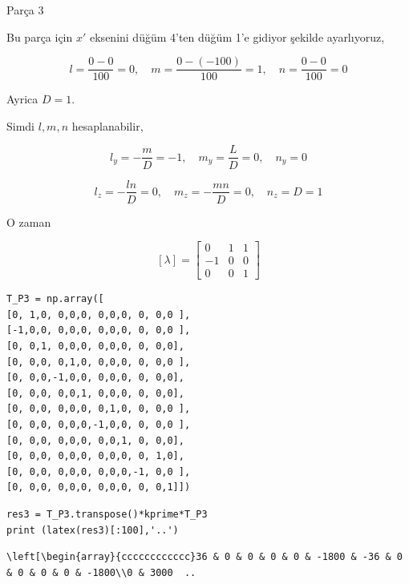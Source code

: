 \documentclass[12pt,fleqn]{article}\usepackage{../../common}
\begin{document}
Parça 3

Bu parça için $x'$ eksenini düğüm 4'ten düğüm 1'e gidiyor şekilde ayarlıyoruz,

$$
l = \frac{0 - 0}{100} = 0, \quad
m = \frac{0 - (-100)}{100} = 1, \quad
n = \frac{0 - 0}{100} = 0
$$

Ayrica $D = 1$.

Simdi $l,m,n$ hesaplanabilir,

$$
l_y = - \frac{m}{D} = -1, \quad
m_y = \frac{L}{D} = 0, \quad
n_y = 0
$$

$$
l_z = - \frac{ln}{D} = 0, \quad
m_z = - \frac{mn}{D} = 0, \quad
n_z = D = 1
$$

O zaman

$$
[ \lambda ] = \left[\begin{array}{rrr}
0 & 1 & 1 \\ -1 & 0 & 0 \\ 0 & 0 & 1
\end{array}\right]
$$

\begin{verbatim}
T_P3 = np.array([
[0, 1,0, 0,0,0, 0,0,0, 0, 0,0 ],
[-1,0,0, 0,0,0, 0,0,0, 0, 0,0 ],
[0, 0,1, 0,0,0, 0,0,0, 0, 0,0],
[0, 0,0, 0,1,0, 0,0,0, 0, 0,0 ],
[0, 0,0,-1,0,0, 0,0,0, 0, 0,0],
[0, 0,0, 0,0,1, 0,0,0, 0, 0,0],
[0, 0,0, 0,0,0, 0,1,0, 0, 0,0 ],
[0, 0,0, 0,0,0,-1,0,0, 0, 0,0 ],
[0, 0,0, 0,0,0, 0,0,1, 0, 0,0],
[0, 0,0, 0,0,0, 0,0,0, 0, 1,0],
[0, 0,0, 0,0,0, 0,0,0,-1, 0,0 ],
[0, 0,0, 0,0,0, 0,0,0, 0, 0,1]])
\end{verbatim}

\begin{verbatim}
res3 = T_P3.transpose()*kprime*T_P3
print (latex(res3)[:100],'..')
\end{verbatim}

\begin{verbatim}
\left[\begin{array}{cccccccccccc}36 & 0 & 0 & 0 & 0 & -1800 & -36 & 0 & 0 & 0 & 0 & -1800\\0 & 3000  ..
\end{verbatim}
\end{document}
